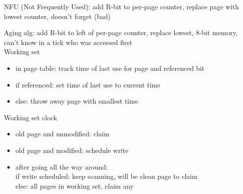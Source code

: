 \documentclass[10pt]{article}
\begin{document}
NFU (Not Frequently Used): add R-bit to per-page counter, replace page with lowest counter, doesn't forget (bad)

Aging alg: add R-bit to left of per-page counter, replace lowest, 8-bit memory, can't know in a tick who was accessed first\\


Working set
\begin{itemize}
    \item in page table: track time of last use for page and referenced bit
    \item if referenced: set time of last use to current time
    \item else: throw away page with smallest time
\end{itemize}

Working set clock
\begin{itemize}
    \item old page and unmodified: claim
    \item old page and modified: schedule write
    \item after going all the way around:\\
        if write scheduled: keep scanning, will be clean page to claim\\
        else: all pages in working set, claim any
\end{itemize}
\end{document}
